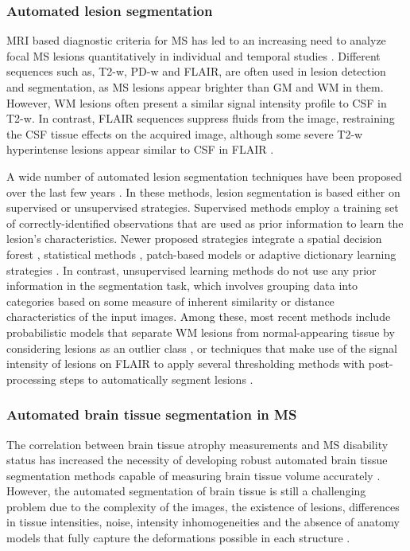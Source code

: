 \subsubsection{Automated lesion segmentation}

MRI based diagnostic criteria for MS has led to an increasing need to analyze focal MS lesions quantitatively in individual and temporal studies \cite{Cabezas2014, Polman2011}. Different sequences such as, T2-w, PD-w and FLAIR, are often used in lesion detection and segmentation, as MS lesions appear brighter than GM and WM in them. However, WM lesions often present a similar signal intensity profile to CSF in T2-w. In contrast, FLAIR sequences suppress fluids from the image, restraining the CSF tissue effects on the acquired image, although some severe T2-w hyperintense lesions appear similar to CSF in FLAIR \cite{Harmouche2015}. 

A wide number of automated lesion segmentation techniques have been proposed over the last few years \cite{Garcia-Lorenzo2013, Llado2012}. In these methods, lesion segmentation is based either on supervised or unsupervised strategies. Supervised methods employ a training set of correctly-identified observations that are used as prior information to learn the lesion's characteristics. Newer proposed strategies integrate a spatial decision forest \cite{Geremia2011}, statistical methods \cite{Sweeney2013}, patch-based models \cite{Guizard2015} or adaptive dictionary learning strategies \cite{Deshpande2015}. In contrast, unsupervised learning methods do not use any prior information in the segmentation task, which involves grouping data into categories based on some measure of inherent similarity or distance characteristics of the input images. Among these, most recent methods include probabilistic models that separate WM lesions from normal-appearing tissue by considering lesions as an outlier class \cite{Harmouche2015,Jain2015,Tomas-Fernandez2015}, or techniques that make use of the signal intensity of lesions on FLAIR to apply several thresholding methods with post-processing steps to automatically segment lesions \cite{Roura2015, Schmidt2012}. 


\subsubsection{Automated brain tissue segmentation in MS}
\label{subsec:lesion_segmentation}
The correlation between brain tissue atrophy measurements and MS disability status \cite{Filippi2013, Fisher2008} has increased the necessity of developing robust automated brain tissue segmentation methods capable of measuring brain tissue volume accurately \cite{Giorgio2013}. However, the automated segmentation of brain tissue is still a challenging problem due to the complexity of the images, the existence of lesions, differences in tissue intensities, noise, intensity inhomogeneities and the absence of anatomy models that fully capture the deformations possible in each structure \cite{Cabezas2011, Kapur1996}. 

